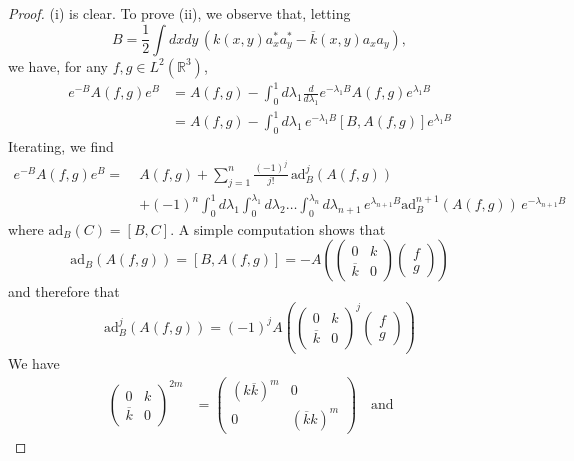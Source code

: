 \documentclass[11pt,a4paper]{article}
\newcommand{\bR}{{\mathbb R}}
\begin{document}
\begin{proof}
(i) is clear. To prove (ii), we observe that, letting 
\[  B = \frac{1}{2} \int dx dy \, \left(k(x,y) a_x^* a_y^* - \overline{k} (x,y) a_x a_y \right) , \]
we have, for any $f,g \in L^2 (\bR^3)$,  
\[ \begin{split} e^{-B} A (f,g) e^{B} & = A (f,g) - \int_0^1 d \lambda_1  \frac{d}{d\lambda_1} e^{-\lambda_1 B} A (f,g) e^{\lambda_1 B}\\
& = A (f,g) - \int_0^1 d \lambda_1  \, e^{-\lambda_1 B} [B,A (f,g)] e^{\lambda_1 B}
 \end{split} \]
Iterating, we find
\begin{equation}\label{eq:baker} \begin{split} e^{-B} A (f,g) e^{B} = \; &A (f,g) + \sum_{j=1}^n \frac{(-1)^j}{j!} \,\text{ad}_B^j (A (f,g)) \\ &+(-1)^n  \int_0^1 d\lambda_1 \int_0^{\lambda_1} d\lambda_2 \dots \int_0^{\lambda_{n}} d\lambda_{n+1} \, e^{\lambda_{n+1} B}  \text{ad}_B^{n+1} (A (f,g)) \, e^{-\lambda_{n+1} B}  \end{split}\end{equation}
where $\text{ad}_B (C) = [B,C]$. A simple computation shows that 
\[  \text{ad}_B (A (f,g)) = [ B, A(f,g)] = - A \left(\left(  \begin{array}{ll}0 &  k  \\ \overline{k} & 0 \end{array} \right) \left( \begin{array}{l} f \\ g \end{array} \right) \right)  \]
and therefore that 
\[ \text{ad}^j_B (A (f,g)) = (-1)^j A  \left(\left(  \begin{array}{ll}0 &  k  \\ \overline{k} & 0 \end{array} \right)^j \left( \begin{array}{l} f \\ g \end{array} \right) \right) \]
We have 
\[ \begin{split} \left(  \begin{array}{ll}0 &  k  \\ \overline{k} & 0 \end{array} \right)^{2m} &= \left(  \begin{array}{ll} (k \overline{k})^m &  0 \\  0  & (\overline{k} k)^m  \end{array} \right)  \quad \text{and } \quad

\end{split}\]
\end{proof}
\end{document}
